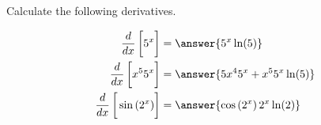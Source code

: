 \documentclass{ximera}
\author{Nela Lakos \and Kyle Parson}
\begin{document}
\begin{exercise}


Calculate the following derivatives.

\begin{align*}
\frac{d}{dx}\left[\vphantom{\frac{d}{dx}}5^x\right] &= \answer{5^x\ln(5)}\\
\frac{d}{dx}\left[\vphantom{\frac{d}{dx}}x^{5}5^x\right] &= \answer{5x^4 5^x + x^5 5^x\ln(5)}\\
\frac{d}{dx}\left[\vphantom{\frac{d}{dx}}\sin\left(2^x\right)\right]  &= \answer{\cos\left(2^{x}\right)2^{x}\ln(2)}
\end{align*}
\end{exercise}
\end{document}
